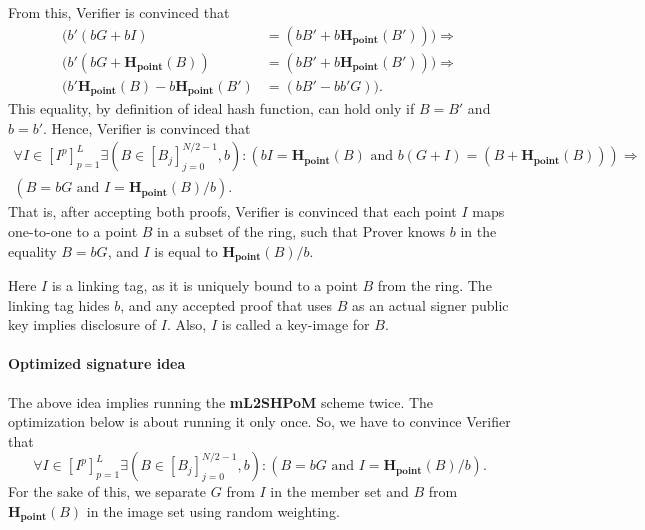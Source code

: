 \documentclass{mathcryptology} %
\newcommand{\Hpoint}{\textbf{H}_{\textbf{point}}}
\theoremstyle{title}
\theoremstyle{titleof}
\begin{document}
    From this, Verifier is convinced that
    \begin{align*}
        (b'(bG+bI) & = (bB'+b \Hpoint(B'))) \Rightarrow\\
        (b'(bG+\Hpoint(B)) & = (bB'+b\Hpoint(B')))\Rightarrow\\
        (b'\Hpoint(B)-b\Hpoint(B') & =(bB'-bb'G)).
    \end{align*}
    This equality, by definition of ideal hash function, can hold only if $B=B'$ and $b=b'$. Hence, Verifier is convinced that
    \begin{gather*}
        \forall I\in {\left[I^{p}\right]}_{p=1}^{L} \exists \left(
        B\in {\left[B_{j}\right]}_{j=0}^{N/2-1},b \right):
        \left( bI = \Hpoint\left(B\right) \text{ and }
        b\left(G+I\right)=\left(B+ \Hpoint \left(B\right)\right)\right) \Rightarrow\\
        \left(B=bG \text{ and } I=\Hpoint \left(B\right)/b \right).
    \end{gather*}
    That is, after accepting both proofs, Verifier is convinced that each point $I$ maps one-to-one to a point $B$ in a subset of the ring, such that Prover knows $b$ in the equality $B=bG$, and $I$ is equal to $\Hpoint\left(B\right)/b$.

    Here $I$ is a linking tag, as it is uniquely bound to a point $B$ from the ring. The linking tag hides
    $b$, and any accepted proof that uses $B$ as an actual signer public key implies disclosure of
    $I$. Also, $I$ is called a key-image for $B$.


\paragraph{Optimized signature idea}\label{Sec:8.3.1.1.}
    The above idea implies running the \textbf{mL2SHPoM} scheme twice. The optimization below is about running it only once.
    So, we have to convince Verifier that
    \begin{equation*}
        \forall I\in{\left[I^{p}\right]}_{p=1}^{L} \exists
        \left( B\in {\left[B_{j}\right]}_{j=0}^{N/2-1},b \right):
        \left(B=bG \text{ and }
        I = \Hpoint \left(B\right)/b\right).
    \end{equation*}
    For the sake of this, we separate $G$ from $I$ in the member set and $B$ from $\Hpoint\left(B\right)$ in the image set using random weighting.
\end{document}
